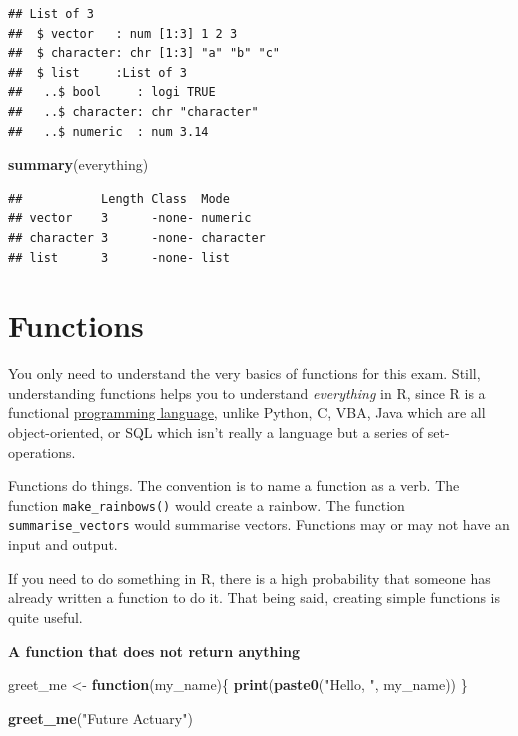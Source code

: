 \documentclass[openany]{book}
\newenvironment{Shaded}{\begin{snugshade}}{\end{snugshade}}
\newcommand{\ControlFlowTok}[1]{\textcolor[rgb]{0.13,0.29,0.53}{\textbf{#1}}}
\newcommand{\KeywordTok}[1]{\textcolor[rgb]{0.13,0.29,0.53}{\textbf{#1}}}
\newcommand{\NormalTok}[1]{#1}
\newcommand{\StringTok}[1]{\textcolor[rgb]{0.31,0.60,0.02}{#1}}
\begin{document}
\begin{verbatim}
## List of 3
##  $ vector   : num [1:3] 1 2 3
##  $ character: chr [1:3] "a" "b" "c"
##  $ list     :List of 3
##   ..$ bool     : logi TRUE
##   ..$ character: chr "character"
##   ..$ numeric  : num 3.14
\end{verbatim}

\begin{Shaded}
\begin{Highlighting}[]
\KeywordTok{summary}\NormalTok{(everything)}
\end{Highlighting}
\end{Shaded}

\begin{verbatim}
##           Length Class  Mode     
## vector    3      -none- numeric  
## character 3      -none- character
## list      3      -none- list
\end{verbatim}

\hypertarget{functions}{%
\section{Functions}\label{functions}}

You only need to understand the very basics of functions for this exam. Still, understanding functions helps you to understand \emph{everything} in R, since R is a functional \href{http://adv-r.had.co.nz/Functional-programming.html}{programming language}, unlike Python, C, VBA, Java which are all object-oriented, or SQL which isn't really a language but a series of set-operations.

Functions do things. The convention is to name a function as a verb. The function \texttt{make\_rainbows()} would create a rainbow. The function \texttt{summarise\_vectors} would summarise vectors. Functions may or may not have an input and output.

If you need to do something in R, there is a high probability that someone has already written a function to do it. That being said, creating simple functions is quite useful.

\textbf{A function that does not return anything}

\begin{Shaded}
\begin{Highlighting}[]
\NormalTok{greet_me <-}\StringTok{ }\ControlFlowTok{function}\NormalTok{(my_name)\{}
  \KeywordTok{print}\NormalTok{(}\KeywordTok{paste0}\NormalTok{(}\StringTok{"Hello, "}\NormalTok{, my_name))}
\NormalTok{\}}

\KeywordTok{greet_me}\NormalTok{(}\StringTok{"Future Actuary"}\NormalTok{)}
\end{Highlighting}
\end{Shaded}
\end{document}

